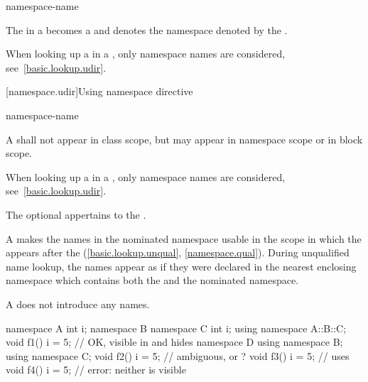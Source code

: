 \begin{bnf}
\br
     namespace-name
\end{bnf}

\pnum
The  in a 
becomes a  and denotes the namespace denoted by the
.
\begin{note}
When looking up a  in a
, only namespace names are
considered, see~\ref{basic.lookup.udir}.
\end{note}

[namespace.udir]{Using namespace directive}%

\begin{bnf}
\br
        namespace-name \terminal{;}
\end{bnf}

\pnum
A  shall not appear in class scope, but may
appear in namespace scope or in block scope.
\begin{note}
When looking up a  in a
, only namespace names are considered,
see~\ref{basic.lookup.udir}.
\end{note}
The optional  appertains to the .

\pnum
\begin{note}
A  makes the names in the nominated
namespace usable in the scope in which the
 appears after the 
(\ref{basic.lookup.unqual}, \ref{namespace.qual}).
During unqualified name lookup, the names
appear as if they were declared in the nearest enclosing namespace which
contains both the  and the nominated
namespace.
\end{note}

\pnum
\begin{note}
A  does not introduce any names.
\end{note}
\begin{example}
\begin{codeblock}
namespace A {
  int i;
  namespace B {
    namespace C {
      int i;
    }
    using namespace A::B::C;
    void f1() {
      i = 5;        // OK,  visible in  and hides 
    }
  }
  namespace D {
    using namespace B;
    using namespace C;
    void f2() {
      i = 5;        // ambiguous,  or ?
    }
  }
  void f3() {
    i = 5;          // uses 
  }
}
void f4() {
  i = 5;            // error: neither  is visible
}
\end{codeblock}
\end{example}

